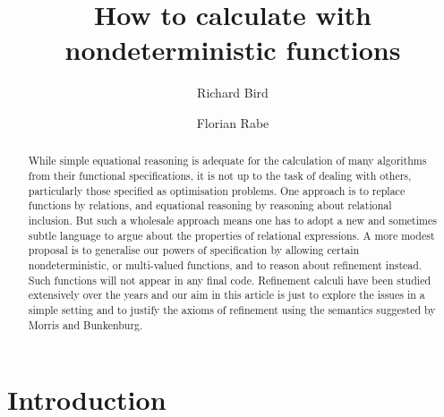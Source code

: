 \documentclass{llncs}
\begin{document}


\title{How to calculate with nondeterministic functions}
\author{Richard Bird \and Florian Rabe}

\date{}
\maketitle

\begin{abstract}
While simple equational reasoning is adequate for the calculation of many algorithms from 
their functional specifications, it is not up to the task of dealing with others,
particularly those specified as optimisation problems. One approach is to replace functions by 
relations, and equational reasoning by reasoning about relational inclusion. But such a wholesale 
approach means one has to adopt a new and sometimes subtle language to argue about the properties 
of relational expressions. A more modest proposal is to generalise our powers of specification by 
allowing certain nondeterministic, or multi-valued functions, and to reason about refinement instead. 
Such functions will not appear in any final code. Refinement calculi have been studied extensively 
over the years and our aim in this article is just to explore the issues in a simple setting and to 
justify the axioms of refinement using the semantics suggested by Morris and Bunkenburg.
\end{abstract}

\section{Introduction}
\end{document}
